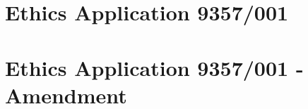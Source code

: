 
\chapter{Ethics Application 9357/001}
\label{app:ethics1}

\chapter{Ethics Application 9357/001 - Amendment}
\label{app:ethics2}

